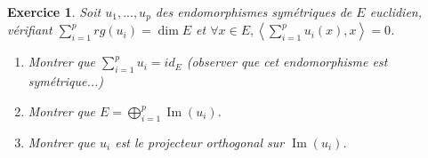 \documentclass[12pt,a4paper]{article}
\newcommand{\ps}[2]{\left\langle#1,#2\right\rangle}
\DeclareMathOperator{\Ima }{Im}
\theoremstyle{break}
\newtheorem{Exo}{Exercice}
\begin{document}
%	
%		
%		
%		
%	

\begin{Exo}

Soit $u_1,...,u_p$ des endomorphismes symétriques de $E$ euclidien, vérifiant $\sum_{i=1}^{p}rg(u_i)=\dim E$ et $\forall x\in E,\ps{\sum_{i=1}^{p}u_i(x)}{x}=0$.
\begin{enumerate}
	\item
	Montrer que $\sum_{i=1}^{p}u_i=id_E$ (observer que cet endomorphisme est symétrique...)
	\item
	Montrer que $E=\bigoplus_{i=1}^p\Ima (u_i)$.
	\item
	Montrer que $u_i$ est le projecteur orthogonal sur $\Ima (u_i)$.
	\end{enumerate}
\end{Exo}
\end{document}
